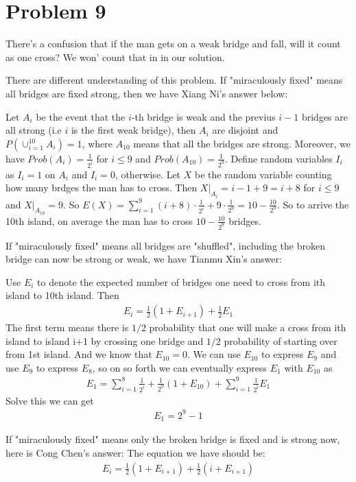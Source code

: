 \documentclass[12pt]{amsart}
\begin{document}
\section{Problem 9}

There's a confusion that if the man gets on a weak bridge and fall, will it count as one cross? We won' count that in in our solution.

There are different understanding of this problem. If "miraculously fixed" means all bridges are fixed strong, then we have Xiang Ni's answer below:

Let $A_i$ be the event that the $i$-th bridge is weak and the previus $i-1$ bridges are all strong (i.e $i$ is the first weak bridge), then $A_i$ are disjoint and $P(\cup_{i=1}^{10}A_i)=1$, where $A_{10}$ means that all the bridges are strong. Moreover, we have $Prob(A_i)=\frac{1}{2^i}$ for $i\le 9 $ and $Prob(A_{10})=\frac{1}{2^{9}}$. Define random variables $I_i$ as $I_i=1$ on $A_i$ and $I_i=0$, otherwise. Let $X$ be the random variable counting how many brdges the man has to cross. Then $X|_{A_i}=i-1+9=i+8$ for $i\le 9$ and $X|_{A_{10}}=9$. So $E(X)=\sum_{i=1}^{9}(i+8)\cdot\frac{1}{2^i}+9\cdot\frac{1}{2^{9}} = 10-\frac{10}{2^9}$. So to arrive the 10th island, on average the man has to cross $10-\frac{10}{2^{9}}$ bridges.

If "miraculously fixed" means all bridges are "shuffled", including the broken bridge can now be strong or weak, we have Tianmu Xin's answer:

Use $E_i$ to denote the expected number of bridges one need to cross from ith island to 10th island. 
Then 
\begin{eqnarray*}
E_i = \frac{1}{2} (1+E_{i+1} )+\frac{1}{2} E_1	
\end{eqnarray*}
The first term means there is $1/2$ probability that one will make a cross from ith island to island i+1 by crossing one bridge and $1/2$ probability of starting over from 1st island. And we know that $E_10=0$. 
We can use $E_10$ to express $E_9$ and use $E_9$ to express $E_8$, so on so forth we can eventually express $E_1$ with $E_10$ as
\begin{eqnarray*}
E_1=\sum_{i=1}^8 \frac{1}{2^i} + \frac{1}{2^9}  (1+E_{10} )+\sum_{i=1}^9 \frac{1}{2^i}  E_1
\end{eqnarray*}
Solve this we can get
\begin{eqnarray*}
	E_1=2^9-1
\end{eqnarray*}


If "miraculously fixed" means only the broken bridge is fixed and is strong now, here is Cong Chen's answer:
The equation we have should be:
\begin{eqnarray*}
	E_i = \frac{1}{2}(1+E_{i+1}) + \frac{1}{2}(i + E_{i+1})
\end{eqnarray*}
\end{document}
